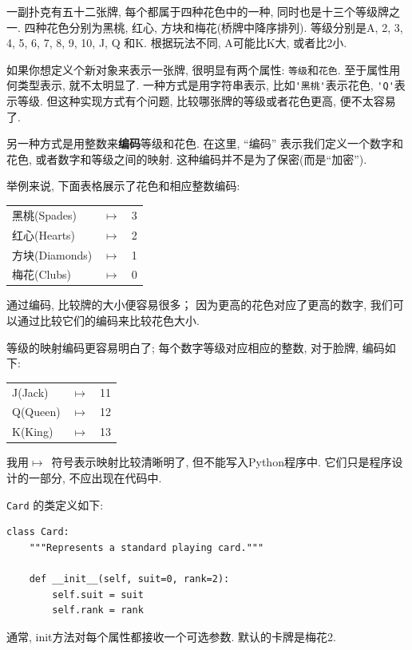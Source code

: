 \documentclass[10pt]{book}
\begin{document}
一副扑克有五十二张牌, 每个都属于四种花色中的一种, 同时也是十三个等级牌之一. 
四种花色分别为黑桃, 红心, 方块和梅花(桥牌中降序排列). 
等级分别是A, 2, 3, 4, 5, 6, 7, 8, 9, 10, J, Q 和K. 根据玩法不同, 
A可能比K大, 或者比2小. 

如果你想定义个新对象来表示一张牌, 
很明显有两个属性: {\tt 等级}和{\tt 花色}.
至于属性用何类型表示, 就不太明显了. 
一种方式是用字符串表示, 比如\verb"'黑桃'"表示花色, 
\verb"'Q'"表示等级. 
但这种实现方式有个问题, 比较哪张牌的等级或者花色更高, 便不太容易了. 

另一种方式是用整数来{\bf 编码}等级和花色. 
在这里, ``编码'' 表示我们定义一个数字和花色, 或者数字和等级之间的映射. 
这种编码并不是为了保密(而是``加密''). 

\newcommand{\mymapsto}{$\mapsto$}

举例来说, 下面表格展示了花色和相应整数编码:

\begin{tabular}{l c l}
黑桃(Spades) & \mymapsto & 3 \\
红心(Hearts) & \mymapsto & 2 \\
方块(Diamonds) & \mymapsto & 1 \\
梅花(Clubs) & \mymapsto & 0
\end{tabular}

通过编码, 比较牌的大小便容易很多；
因为更高的花色对应了更高的数字, 我们可以通过比较它们的编码来比较花色大小. 

等级的映射编码更容易明白了; 
每个数字等级对应相应的整数, 对于脸牌, 编码如下:

\begin{tabular}{l c l}
J(Jack) & \mymapsto & 11 \\
Q(Queen) & \mymapsto & 12 \\
K(King) & \mymapsto & 13 \\
\end{tabular}

我用\mymapsto~符号表示映射比较清晰明了, 但不能写入Python程序中. 
它们只是程序设计的一部分, 不应出现在代码中. 

{\tt Card} 的类定义如下:

\begin{verbatim}
class Card:
    """Represents a standard playing card."""

    def __init__(self, suit=0, rank=2):
        self.suit = suit
        self.rank = rank
\end{verbatim}
%
通常, init方法对每个属性都接收一个可选参数. 
默认的卡牌是梅花2.
\end{document}
